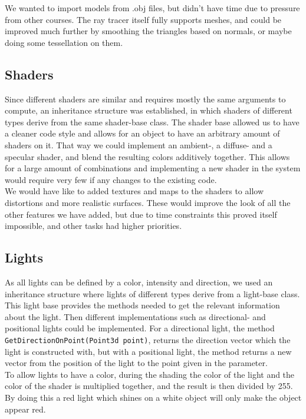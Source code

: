 We wanted to import models from .obj files, but didn’t have time due to pressure from other courses. The ray tracer itself fully supports meshes, and could be improved much further by smoothing the triangles based on normals, or maybe doing some tessellation on them.

\subsection{Shaders}
Since different shaders are similar and requires mostly the same arguments to compute, an inheritance structure was established, in which shaders of different types derive from the same shader-base class. The shader base allowed us to have a cleaner code style and allows for an object to have an arbitrary amount of shaders on it. That way we could implement an ambient-, a diffuse- and a specular shader, and blend the resulting colors additively together. This allows for a large amount of combinations and implementing a new shader in the system would require very few if any changes to the existing code. \\

We would have like to added textures and maps to the shaders to allow distortions and more realistic surfaces. These would improve the look of all the other features we have added, but due to time constraints this proved itself impossible, and other tasks had higher priorities.

\subsection{Lights}
As all lights can be defined by a color, intensity and direction, we used an inheritance structure where lights of different types derive from a light-base class. This light base provides the methods needed to get the relevant information about the light. Then different implementations such as directional- and positional lights could be implemented. For a directional light, the method \texttt{GetDirectionOnPoint(Point3d point)}, returns the direction vector which the light is constructed with, but with a positional light, the method returns a new vector from the position of the light to the point given in the parameter.\\

To allow lights to have a color, during the shading the color of the light and the color of the shader is multiplied together, and the result is then divided by 255. By doing this a red light which shines on a white object will only make the object appear red.\\

